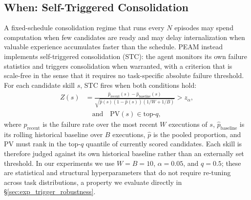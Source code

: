 \documentclass[11pt]{article}
\begin{document}
\subsection{When: Self-Triggered Consolidation}
\label{sec:method_when}
A fixed-schedule consolidation regime that runs every $N$ episodes may spend computation when few candidates are ready and may delay internalization when valuable experience accumulates faster than the schedule. PEAM instead implements self-triggered consolidation (STC): the agent monitors its own failure statistics and triggers consolidation when warranted, with a criterion that is scale-free in the sense that it requires no task-specific absolute failure threshold. For each candidate skill $s$, STC fires when both conditions hold:
\begin{equation}
\begin{aligned}
Z(s) &= \frac{\hat{p}_{\text{recent}}(s)-\hat{p}_{\text{baseline}}(s)}
{\sqrt{\hat{p}(s)(1-\hat{p}(s))(1/W+1/B)}} > z_{\alpha}, \\
& \quad \text{and} \quad \text{PV}(s)\in\text{top-}q,
\end{aligned}
\label{eq:stc}
\end{equation}
where $\hat{p}_{\text{recent}}$ is the failure rate over the most recent $W$ executions of $s$, $\hat{p}_{\text{baseline}}$ is its rolling historical baseline over $B$ executions, $\hat{p}$ is the pooled proportion, and PV must rank in the top-$q$ quantile of currently scored candidates. Each skill is therefore judged against its own historical baseline rather than an externally set threshold. In our experiments we use $W=B=10$, $\alpha=0.05$, and $q=0.5$; these are statistical and structural hyperparameters that do not require re-tuning across task distributions, a property we evaluate directly in \S\ref{sec:exp_trigger_robustness}.
\end{document}

